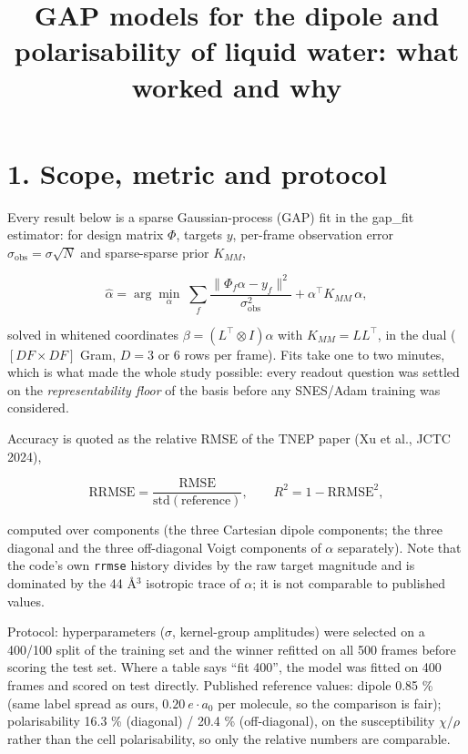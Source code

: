 \documentclass[11pt,a4paper]{article}
\title{GAP models for the dipole and polarisability of liquid water: what worked and why}
\author{}
\date{}
\begin{document}
\maketitle

\section{1. Scope, metric and protocol}\label{scope-metric-and-protocol}

Every result below is a sparse Gaussian-process (GAP) fit in the gap\_fit estimator: for design
matrix \(\Phi\), targets \(y\), per-frame observation error \(\sigma_\mathrm{obs} = \sigma\sqrt{N}\)
and sparse-sparse prior \(K_{MM}\),

\[
\hat\alpha = \arg\min_\alpha \; \sum_f \frac{\lVert \Phi_f\alpha - y_f\rVert^2}{\sigma_\mathrm{obs}^2} + \alpha^\top K_{MM}\,\alpha ,
\]

solved in whitened coordinates \(\beta = (L^\top\!\otimes I)\alpha\) with \(K_{MM}=LL^\top\), in the
dual (\([DF\times DF]\) Gram, \(D=3\) or \(6\) rows per frame). Fits take one to two minutes, which
is what made the whole study possible: every readout question was settled on the
\emph{representability floor} of the basis before any SNES/Adam training was considered.

Accuracy is quoted as the relative RMSE of the TNEP paper (Xu et al., JCTC 2024),

\[
\mathrm{RRMSE} = \frac{\mathrm{RMSE}}{\mathrm{std}(\text{reference})},\qquad R^2 = 1-\mathrm{RRMSE}^2 ,
\]

computed over components (the three Cartesian dipole components; the three diagonal and the three
off-diagonal Voigt components of \(\alpha\) separately). Note that the code's own \texttt{rrmse}
history divides by the raw target magnitude and is dominated by the 44 \AA{}\(^3\) isotropic trace
of \(\alpha\); it is not comparable to published values.

Protocol: hyperparameters (\(\sigma\), kernel-group amplitudes) were selected on a 400/100 split of
the training set and the winner refitted on all 500 frames before scoring the test set. Where a
table says ``fit 400'', the model was fitted on 400 frames and scored on test directly. Published
reference values: dipole 0.85 \% (same label spread as ours, \(0.20\ e\cdot a_0\) per molecule, so
the comparison is fair); polarisability 16.3 \% (diagonal) / 20.4 \% (off-diagonal), on the
susceptibility \(\chi/\rho\) rather than the cell polarisability, so only the relative numbers are
comparable.
\end{document}
